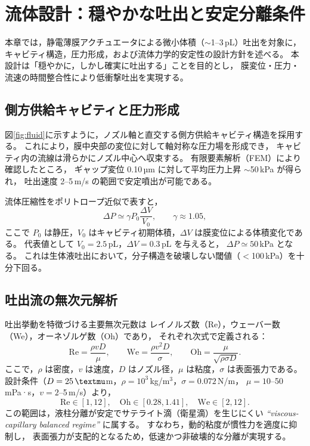 \section{流体設計：穏やかな吐出と安定分離条件}

本章では，静電薄膜アクチュエータによる微小体積（$\sim$1--3\,pL）吐出を対象に，
キャビティ構造，圧力形成，および流体力学的安定性の設計方針を述べる。
本設計は「穏やかに，しかし確実に吐出する」ことを目的とし，
膜変位・圧力・流速の時間整合性により低衝撃吐出を実現する。

\subsection{側方供給キャビティと圧力形成}
図\ref{fig:fluid}に示すように，ノズル軸と直交する側方供給キャビティ構造を採用する。
これにより，膜中央部の変位に対して軸対称な圧力場を形成でき，
キャビティ内の流線は滑らかにノズル中心へ収束する。
有限要素解析（FEM）により確認したところ，
ギャップ変位 0.10\,µm に対して平均圧力上昇 $\sim$50\,kPa が得られ，
吐出速度 2–5\,m/s の範囲で安定噴出が可能である。

流体圧縮性をポリトロープ近似で表すと，
\begin{equation}
\Delta P \simeq \gamma P_0 \frac{\Delta V}{V_0},\qquad \gamma \approx 1.05,
\label{eq:pressure}
\end{equation}
ここで $P_0$ は静圧，$V_0$ はキャビティ初期体積，$\Delta V$ は膜変位による体積変化である。
代表値として $V_0=2.5$\,pL，$\Delta V=0.3$\,pL を与えると，
$\Delta P\simeq50$\,kPa となる。
これは生体液吐出において，分子構造を破壊しない閾値（$<$100\,kPa）を十分下回る。

\subsection{吐出流の無次元解析}
吐出挙動を特徴づける主要無次元数は
レイノルズ数（Re），ウェーバー数（We），オーネゾルゲ数（Oh）であり，
それぞれ次式で定義される：
\begin{equation}
\mathrm{Re}=\frac{\rho v D}{\mu}, \qquad
\mathrm{We}=\frac{\rho v^2 D}{\sigma}, \qquad
\mathrm{Oh}=\frac{\mu}{\sqrt{\rho \sigma D}}.
\end{equation}
ここで，$\rho$ は密度，$v$ は速度，$D$ はノズル径，$\mu$ は粘度，$\sigma$ は表面張力である。
設計条件（$D=25\,\textmu$m，$\rho=10^3$\,kg/m$^3$，$\sigma=0.072$\,N/m，
$\mu=10$--50\,mPa·s，$v=2$--5\,m/s）より，
\[
\mathrm{Re}\in[1,12],\quad
\mathrm{Oh}\in[0.28,1.41],\quad
\mathrm{We}\in[2,12].
\]
この範囲は，液柱分離が安定でサテライト滴（衛星滴）を生じにくい
\emph{“viscous-capillary balanced regime”} に属する。
すなわち，動的粘度が慣性力を適度に抑制し，
表面張力が支配的となるため，低速かつ非破壊的な分離が実現する。

